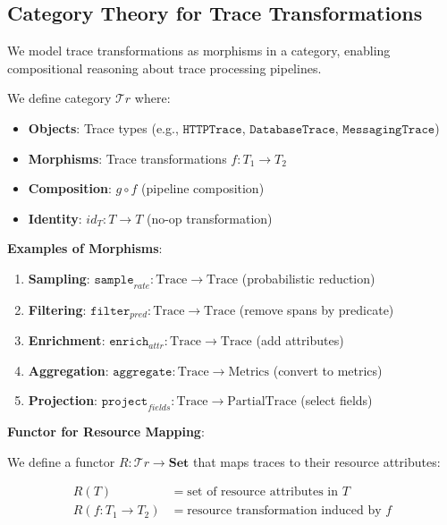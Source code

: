 \subsection{Category Theory for Trace Transformations}
\label{sec:category}

We model trace transformations as morphisms in a category, enabling compositional reasoning about trace processing pipelines.

\begin{definition}
\label{def:trace-category}
We define category $\mathcal{T}r$ where:
\begin{itemize}
\item \textbf{Objects}: Trace types (e.g., $\texttt{HTTPTrace}$, $\texttt{DatabaseTrace}$, $\texttt{MessagingTrace}$)
\item \textbf{Morphisms}: Trace transformations $f: T_1 \rightarrow T_2$
\item \textbf{Composition}: $g \circ f$ (pipeline composition)
\item \textbf{Identity}: $id_T: T \rightarrow T$ (no-op transformation)
\end{itemize}
\end{definition}

\textbf{Examples of Morphisms}:

\begin{enumerate}
\item \textbf{Sampling}: $\texttt{sample}_{rate}: \text{Trace} \rightarrow \text{Trace}$ (probabilistic reduction)
\item \textbf{Filtering}: $\texttt{filter}_{pred}: \text{Trace} \rightarrow \text{Trace}$ (remove spans by predicate)
\item \textbf{Enrichment}: $\texttt{enrich}_{attr}: \text{Trace} \rightarrow \text{Trace}$ (add attributes)
\item \textbf{Aggregation}: $\texttt{aggregate}: \text{Trace} \rightarrow \text{Metrics}$ (convert to metrics)
\item \textbf{Projection}: $\texttt{project}_{fields}: \text{Trace} \rightarrow \text{PartialTrace}$ (select fields)
\end{enumerate}

\textbf{Functor for Resource Mapping}:

We define a functor $R: \mathcal{T}r \rightarrow \textbf{Set}$ that maps traces to their resource attributes:

\begin{align*}
R(T) &= \text{set of resource attributes in } T \\
R(f: T_1 \rightarrow T_2) &= \text{resource transformation induced by } f
\end{align*}

